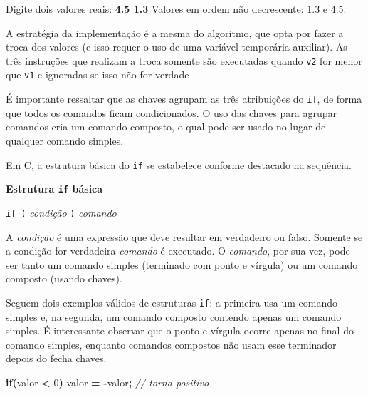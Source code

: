 \documentclass[
  11pt,
  a4paper,
]{scrbook}
\newenvironment{Shaded}{\begin{snugshade}}{\end{snugshade}}
\newcommand{\CommentTok}[1]{\textcolor[rgb]{0.56,0.35,0.01}{\textit{#1}}}
\newcommand{\ControlFlowTok}[1]{\textcolor[rgb]{0.13,0.29,0.53}{\textbf{#1}}}
\newcommand{\DecValTok}[1]{\textcolor[rgb]{0.00,0.00,0.81}{#1}}
\newcommand{\KeywordTok}[1]{\textcolor[rgb]{0.13,0.29,0.53}{\textbf{#1}}}
\newcommand{\NormalTok}[1]{#1}
\newcommand{\OperatorTok}[1]{\textcolor[rgb]{0.81,0.36,0.00}{\textbf{#1}}}
\begin{document}
\begin{Shaded}
\begin{Highlighting}[]
\NormalTok{Digite dois valores reais: }\KeywordTok{ 4.5 1.3 }
\NormalTok{Valores em ordem não decrescente: 1.3 e 4.5.}
\end{Highlighting}
\end{Shaded}

A estratégia da implementação é a mesma do algoritmo, que opta por fazer
a troca dos valores (e isso requer o uso de uma variável temporária
auxiliar). As três instruções que realizam a troca somente são
executadas quando \texttt{v2} for menor que \texttt{v1} e ignoradas se
isso não for verdade

É importante ressaltar que as chaves agrupam as três atribuições do
\texttt{if}, de forma que todos os comandos ficam condicionados. O uso
das chaves para agrupar comandos cria um comando composto, o qual pode
ser usado no lugar de qualquer comando simples.

Em C, a estrutura básica do \texttt{if} se estabelece conforme destacado
na sequência.

\begin{tcolorbox}[enhanced jigsaw, colback=white, arc=.35mm, colframe=quarto-callout-color-frame, toprule=.15mm, leftrule=.75mm, left=2mm, rightrule=.15mm, bottomrule=.15mm, opacityback=0, breakable]

\vspace{-3mm}\textbf{Estrutura \texttt{if} básica}\vspace{3mm}

\texttt{if\ (} \emph{condição} \texttt{)} \emph{comando}

\end{tcolorbox}

A \emph{condição} é uma expressão que deve resultar em verdadeiro ou
falso. Somente se a condição for verdadeira \emph{comando} é executado.
O \emph{comando}, por sua vez, pode ser tanto um comando simples
(terminado com ponto e vírgula) ou um comando composto (usando chaves).

Seguem dois exemplos válidos de estruturas \texttt{if}: a primeira usa
um comando simples e, na segunda, um comando composto contendo apenas um
comando simples. É interessante observar que o ponto e vírgula ocorre
apenas no final do comando simples, enquanto comandos compostos não usam
esse terminador depois do fecha chaves.

\begin{Shaded}
\begin{Highlighting}[]
\ControlFlowTok{if}\OperatorTok{(}\NormalTok{valor }\OperatorTok{\textless{}} \DecValTok{0}\OperatorTok{)}
\NormalTok{    valor }\OperatorTok{=} \OperatorTok{{-}}\NormalTok{valor}\OperatorTok{;} \CommentTok{// torna positivo}
\end{Highlighting}
\end{Shaded}
\end{document}
